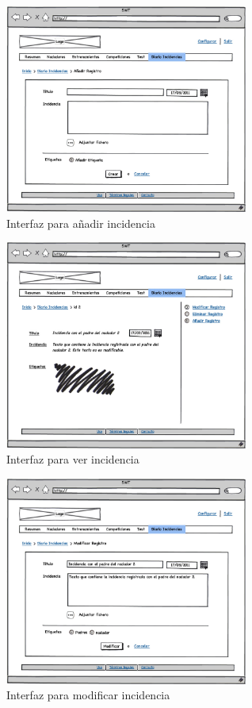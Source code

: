 		\begin{figure}[H]
		  \centering
		    \includegraphics[width=8cm]{./eps/23_Diario_new.eps}
		  \caption{Interfaz para añadir incidencia}
		  \label{fig:interfaz_incidencias_new}
		\end{figure}
		
		\begin{figure}[H]
		  \centering
		    \includegraphics[width=8cm]{./eps/24_Diario_show.eps}
		  \caption{Interfaz para ver incidencia}
		  \label{fig:interfaz_incidencias_show}
		\end{figure}

		\begin{figure}[H]
		  \centering
		    \includegraphics[width=8cm]{./eps/25_Diario_modif.eps}
		  \caption{Interfaz para modificar incidencia}
		  \label{fig:interfaz_incidencias_modif}
		\end{figure}
